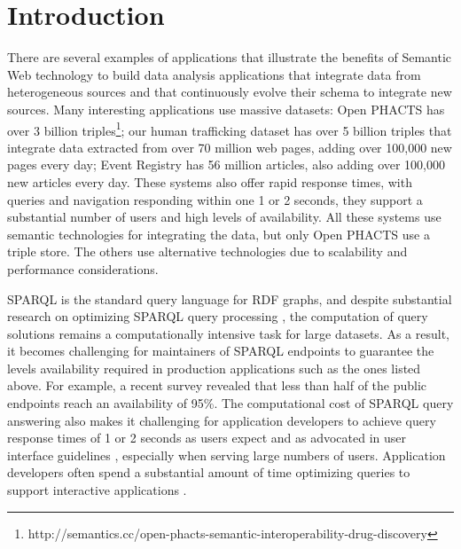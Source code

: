 \section{Introduction}
There are several examples of applications that illustrate the benefits of Semantic Web technology to build data analysis applications that integrate data from heterogeneous sources and that continuously evolve their schema to integrate new sources.
Many interesting applications use massive datasets: 
Open PHACTS \cite{Groth_Loizou_Gray_Goble_Harland_Pettifer_2014} has over 3 billion triples\footnote{http://semantics.cc/open-phacts-semantic-interoperability-drug-discovery};
our human trafficking dataset has over 5 billion triples that integrate data extracted from over 70 million web pages, adding over 100,000 new pages every day;
Event Registry has 56 million articles, also adding over 100,000 new articles every day.
These systems also offer rapid response times, with queries and navigation responding within one 1 or 2 seconds, they support a substantial number of users and high levels of availability.
All these systems use semantic technologies for integrating the data, but only Open PHACTS use a triple store.
The others use alternative technologies due to scalability and performance considerations.

SPARQL is the standard query language for RDF graphs, 
and despite substantial research on optimizing SPARQL query processing \cite{Pham2013}, the computation of query solutions remains a computationally intensive task for large datasets.
As a result, it becomes challenging for maintainers of SPARQL endpoints to guarantee the levels availability required in production applications such as the ones listed above.
For example, a recent survey \cite{buil2013sparql} revealed that less than half of the public endpoints reach an availability of 95\%.
The computational cost of SPARQL query answering also makes it challenging for application developers to achieve query response times of 1 or 2 seconds as users expect and as advocated in user interface guidelines \cite{nielsen1994usability}, especially when serving large numbers of users.
Application developers often spend a substantial amount of time optimizing queries to support interactive applications \cite{Loizou_Angles_Groth_2014}.


